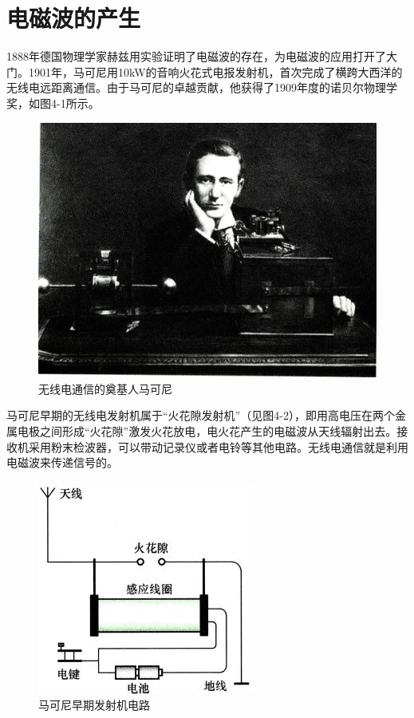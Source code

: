 \documentclass[12pt,UTF8]{ctexbook}
\begin{document}
\section{电磁波的产生}

1888年德国物理学家赫兹用实验证明了电磁波的存在，为电磁波的应用打开了大门。1901年，马可尼用10kW的音响火花式电报发射机，首次完成了横跨大西洋的无线电远距离通信。由于马可尼的卓越贡献，他获得了1909年度的诺贝尔物理学奖，如图4-1所示。

\begin{figure}[htbp]
	\centering
	\includegraphics[width=0.7\linewidth]{44}
	\caption{无线电通信的奠基人马可尼}
	\label{fig:1}
\end{figure}

马可尼早期的无线电发射机属于“火花隙发射机”（见图4-2），即用高电压在两个金属电极之间形成“火花隙”激发火花放电，电火花产生的电磁波从天线辐射出去。接收机采用粉末检波器，可以带动记录仪或者电铃等其他电路。无线电通信就是利用电磁波来传递信号的。

\begin{figure}[htbp]
	\centering
	\includegraphics[width=0.7\linewidth]{45}
	\caption{马可尼早期发射机电路}
	\label{fig:1}
\end{figure}
\end{document}
